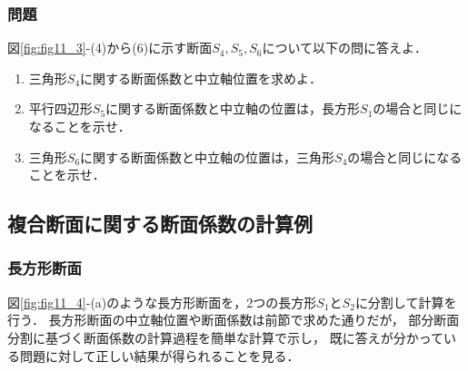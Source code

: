 \documentclass[10pt,a4j]{jbook}
\begin{document}
\subsubsection{問題}
図\ref{fig:fig11_3}-(4)から(6)に示す断面$S_4,S_5,S_6$について以下の問に答えよ．
\begin{enumerate}
\item
三角形$S_4$に関する断面係数と中立軸位置を求めよ．
\item
平行四辺形$S_5$に関する断面係数と中立軸の位置は，長方形$S_1$の場合と同じになることを示せ．
\item
三角形$S_6$に関する断面係数と中立軸の位置は，三角形$S_4$の場合と同じになることを示せ．
\end{enumerate}
\subsection{複合断面に関する断面係数の計算例}
\subsubsection{長方形断面}
図\ref{fig:fig11_4}-(a)のような長方形断面を，2つの長方形$S_1$と$S_2$に分割して計算を行う．
長方形断面の中立軸位置や断面係数は前節で求めた通りだが，
部分断面分割に基づく断面係数の計算過程を簡単な計算で示し，
既に答えが分かっている問題に対して正しい結果が得られることを見る．
\end{document}
